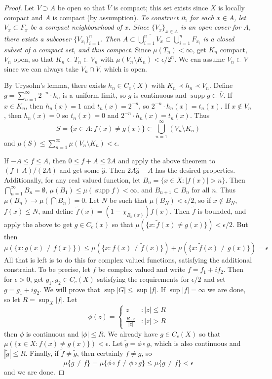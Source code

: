 \documentclass[12pt, a4paper]{book}
\DeclareMathOperator{\supp}{supp}
\theoremstyle{nonumberplain}
\newtheorem{proof}{Proof}
\begin{document}
\begin{proof}
    Let $V\supset A$ be open so that $\overline{V}$ is compact; this set exists since $X$ is locally compact and $A$ is compact (by assumption).
    \textit{To construct it, for each $x\in A$, let $V_x\subset F_x$ be a compact neighbourhood of $x$.
        Since $\{V_x\}_{x\in A}$ is an open cover for $A$, there exists a subcover $\{V_{x_i}\}_{i=1}^n$.
        Then $A\subset \overline{\bigcup_{i=1}^nV_x}\subset \bigcup_{i=1}^n F_{x_i}$ is a closed subset of a compact set, and thus compact.
    }
    Since $\mu(T_n)<\infty$, get $K_n$ compact, $V_n$ open, so that $K_n\subset T_n\subset V_n$ with $\mu(V_n\setminus K_n)<\epsilon/2^n$.
    We can assume $V_n\subset V$ since we can always take $V_n\cap V$, which is open.

    By Urysohn's lemma, there exists $h_n\in C_c(X)$ with $K_n\prec h_n\prec V_n$.
    Define $g=\sum_{n=1}^\infty 2^{-n}\cdot h_n$ is a uniform limit, so $g$ is continuous and $\supp g\subset\overline{V}$.
    If $x\in K_n$, then $h_n(x)=1$ and $t_n(x)=2^{-n}$, so $2^{-n}\cdot h_n(x)=t_n(x)$.
    If $x\notin V_n$, then $h_n(x)=0$ so $t_n(x)=0$ and $2^{-n}\cdot h_n(x)=t_n(x)$.
    Thus
    \[S=\{x\in A:f(x)\neq g(x)\}\subset\bigcup\limits_{n=1}^\infty\left(V_n\setminus K_n\right)\]
    and $\mu(S)\leq\sum_{n=1}^\infty\mu(V_n\setminus K_n)<\epsilon$.

    If $-A\leq f\leq A$, then $0\leq f+A\leq 2A$ and apply the above theorem to $(f+A)/(2A)$ and get some $\hat g$.
    Then $2A\hat g-A$ has the desired properties.
    Additionally, for any real valued function, let $B_n=\{x\in X:|f(x)|>n\}$.
    Then $\bigcap_{n=1}^\infty B_n=\emptyset$, $\mu(B_1)\leq\mu(\supp f)<\infty$, and $B_{n+1}\subset B_n$ for all $n$.
    Thus $\mu(B_n)\to\mu(\bigcap B_n)=0$.
    Let $N$ be such that $\mu(B_N)<\epsilon/2$, so if $x\notin B_N$, $f(x)\leq N$, and define $\tilde f(x)=(1-\chi_{B_n(x)})f(x)$.
    Then $\tilde f$ is bounded, and apply the above to get $g\in C_c(x)$ so that $\mu\left(\{x:\tilde f(x)\neq g(x)\}\right)<\epsilon/2$.
    But then
    \[\mu\left(\{x:g(x)\neq f(x)\}\right)\leq\mu(\{x:f(x)\neq \tilde f(x)\})+\mu(\{x:\tilde f(x)\neq g(x)\})=\epsilon\]
    All that is left is to do this for complex valued functions, satisfying the additional constraint.
    To be precise, let $f$ be complex valued and write $f=f_1+if_2$.
    Then for $\epsilon>0$, get $g_1,g_2\in C_c(X)$ satisfying the requirements for $\epsilon/2$ and set $g=g_1+ig_2$.
    We will prove that $\sup|G|\leq\sup|f|$.
    If $\sup|f|=\infty$ we are done, so let $R=\sup_X|f|$.
    Let
    \[\phi(z)=
        \begin{cases}
            z &:|z|\leq R\\
            \frac{R\cdot z}{|z|}&: |z|>R
        \end{cases}
    \]
    then $\phi$ is continuous and $|\phi|\leq R$.
    We already have $g\in C_c(X)$ so that $\mu(\{x\in X:f(x)\neq g(x)\})<\epsilon$.
    Let $\tilde g=\phi\circ g$, which is also continuous and $|\tilde g|\leq R$.
    Finally, if $\tilde f\neq\tilde g$, then certainly $f\neq g$, so
    \begin{equation*}\mu\{\tilde g\neq f\}=\mu\{\phi\circ f\neq\phi\circ g\}\leq\mu\{g\neq f\}<\epsilon\end{equation*}
    and we are done.
\end{proof}
\end{document}
